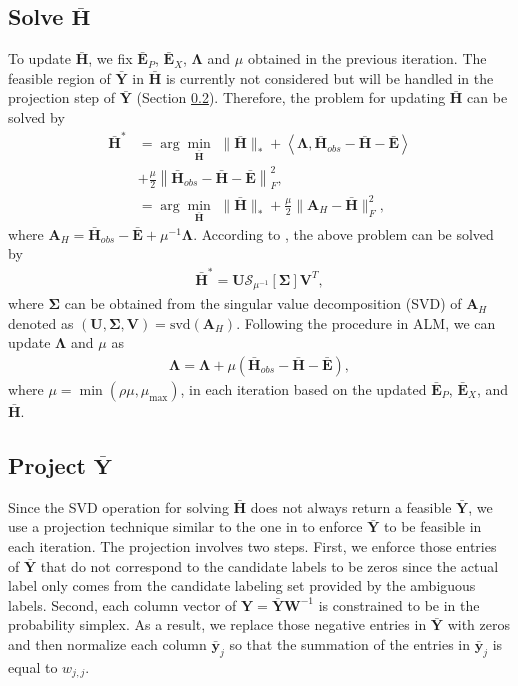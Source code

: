\documentclass[10pt,journal,compsoc]{IEEEtran}
\begin{document}
\subsection{Solve $\bar{\mathbf{H}}$}
To update $\bar{\mathbf{H}}$, we fix $\bar{\mathbf{E}}_P$, $\bar{\mathbf{E}}_X$, $\mathbf{\Lambda}$ and $\mu$ obtained in the previous iteration. The feasible region of $\bar{\mathbf{Y}}$ in $\bar{\mathbf{H}}$ is currently not considered but will be handled in the projection step of $\bar{\mathbf{Y}}$ (Section \ref{subsec:y_step}).
Therefore, the problem for updating $\bar{\mathbf{H}}$ can be solved by
\begin{align}
\bar{\mathbf{H}}^* &= \arg\!\min_{\bar{\mathbf{H}}} \,\,  \| \bar{\mathbf{H}} \|_*
 + \left \langle  \mathbf{\Lambda} ,
\bar{\mathbf{H}}_{obs} -\bar{\mathbf{H}}
-
\bar{\mathbf{E}}
 \right \rangle \\
&+ \frac{\mu}{2}  \left\|
\bar{\mathbf{H}}_{obs} - \bar{\mathbf{H}}
 -
\bar{\mathbf{E}}
 \right\|_F^2, \\
&= \arg\!\min_{\bar{\mathbf{H}}} \,\, \| \bar{\mathbf{H}} \|_*  + \frac{\mu}{2} \| \mathbf{A}_H - \bar{\mathbf{H}} \|_F^2,
\end{align}
where $\mathbf{A}_H = \bar{\mathbf{H}}_{obs}  - \bar{\mathbf{E}} + \mu^{-1} \mathbf{\Lambda}$.
According to \cite{Cai2010}, the above problem can be solved by
\begin{align}
\bar{\mathbf{H}}^* = \mathbf{U} \mathcal{S}_{\mu^{-1}}[\mathbf{\Sigma}] \mathbf{V}^T,
\end{align}
where $\mathbf{\Sigma}$ can be obtained from the singular value decomposition (SVD) of $\mathbf{A}_H$ denoted as $(\mathbf{U}, \mathbf{\Sigma}, \mathbf{V}) = \mathrm{svd}\left(\mathbf{A}_H\right).$
Following the procedure in ALM, we can update $\mathbf{\Lambda}$ and  $\mu$ as
\begin{align}
       \mathbf{\Lambda} = \mathbf{\Lambda} + \mu \left(\bar{\mathbf{H}}_{obs} - \bar{\mathbf{H}} - \bar{\mathbf{E}} \right),
\end{align}
where $\mu = \min(\rho \mu , \mu_{\max} )$, in each iteration based on the updated $\bar{\mathbf{E}}_P$, $\bar{\mathbf{E}}_X$, and $\bar{\mathbf{H}}$.


\subsection{Project $\bar{\mathbf{Y}}$}  \label{subsec:y_step}
Since the SVD operation for solving $\bar{\mathbf{H}}$ does not always return a feasible $\bar{\mathbf{Y}}$, we use a projection technique similar to the one in \cite{Goldberg2010,Cabral2011} to enforce $\bar{\mathbf{Y}}$ to be feasible in each iteration. The projection involves two steps. First, we enforce those entries of $\bar{\mathbf{Y}}$ that do not correspond to the candidate labels to be zeros since the actual label only comes from the candidate labeling set provided by the ambiguous labels. Second, each column vector of $\mathbf{Y} = \bar{\mathbf{Y}} \mathbf{W}^{-1}$ is constrained to be in the probability simplex. As a result, we replace those negative entries in $\bar{\mathbf{Y}}$ with zeros and then normalize each column $\bar{\mathbf{y}}_j$ so that the summation of the entries in $\bar{\mathbf{y}}_j$ is equal to $w_{j,j}$.
\end{document}
